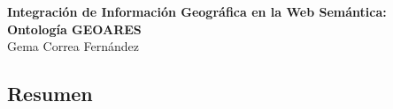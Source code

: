 \chapter*{}
\thispagestyle{empty}






\cleardoublepage
\thispagestyle{empty}

\begin{center} 
	\large{\textbf{Integración de Información Geográfica en la Web Semántica:\\ Ontología GEOARES}}\\
	\vspace{0.25in}
	Gema Correa Fernández
\end{center}


\section*{Resumen}


